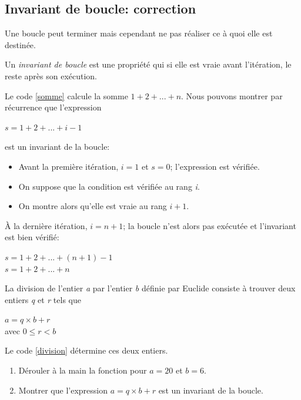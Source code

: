 \documentclass[a4paper,11pt]{article}
\begin{document}
\begin{Form}
\section{Invariant de boucle: correction}
Une boucle peut terminer mais cependant ne pas réaliser ce à quoi elle est destinée.
\begin{aretenir}[]
Un \emph{invariant de boucle} est une propriété qui si elle est vraie avant l'itération, le reste après son exécution.
\end{aretenir}
\begin{center}

\label{somme}
\end{center}
Le code \ref{somme} calcule la somme $1+2+...+n$. Nous pouvons montrer par récurrence que l'expression \begin{center}
$s=1+2+...+i-1$
\end{center} est un invariant de la boucle:
\begin{itemize}
\item Avant la première itération, $i=1$ et $s=0$; l'expression est vérifiée.
\item On suppose que la condition est vérifiée au rang \emph{i}.
\item On montre alors qu'elle est vraie au rang $i+1$.
\end{itemize}
\begin{aretenir}[Remarque]
À la dernière itération, $i=n+1$; la boucle n'est alors pas exécutée et l'invariant est bien vérifié:
\begin{center}
$s=1+2+...+(n+1)-1$
\\$s=1+2+...+n$
\end{center}
\end{aretenir}
\begin{activite}
La division de l'entier \emph{a} par l'entier \emph{b} définie par Euclide consiste à trouver deux entiers \emph{q} et \emph{r} tels que 
\begin{center}
$a=q×b+r$
\\avec $0\leq r <b$
\end{center}
Le code \ref{division} détermine ces deux entiers.
\begin{center}

\label{division}
\end{center}
\begin{enumerate}
\item Dérouler à la main la fonction pour $a=20$ et $b=6$.
\item Montrer que l'expression $a=q×b+r$ est un invariant de la boucle.
\end{enumerate}
\end{activite}

\end{Form}
\end{document}
